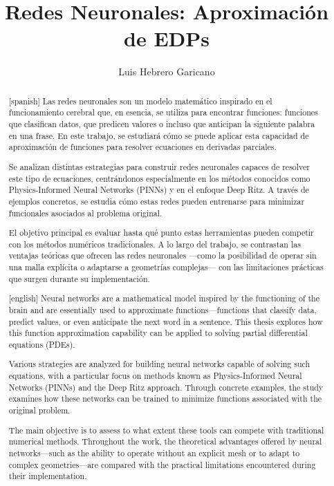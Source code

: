 \documentclass[a4paper,11pt,spanish, twoside, leqno]{tfg-uam}
\title{Redes Neuronales: Aproximación de EDPs}
\author{Luis Hebrero Garicano}
\theoremstyle{definition}
\begin{document}
\begin{abstract}[spanish]
Las redes neuronales son un modelo matemático inspirado en el funcionamiento cerebral que, en esencia, se utiliza para encontrar funciones: funciones que clasifican datos, que predicen valores o incluso que anticipan la siguiente palabra en una frase. En este trabajo, se estudiará cómo se puede aplicar esta capacidad de aproximación de funciones para resolver ecuaciones en derivadas parciales. 

Se analizan distintas estrategias para construir redes neuronales capaces de resolver este tipo de ecuaciones, centrándonos especialmente en los métodos conocidos como Physics-Informed Neural Networks (PINNs) y en el enfoque Deep Ritz. A través de ejemplos concretos, se estudia cómo estas redes pueden entrenarse para minimizar funcionales asociados al problema original.

El objetivo principal es evaluar hasta qué punto estas herramientas pueden competir con los métodos numéricos tradicionales. A lo largo del trabajo, se contrastan las ventajas teóricas que ofrecen las redes neuronales —como la posibilidad de operar sin una malla explícita o adaptarse a geometrías complejas— con las limitaciones prácticas que surgen durante su implementación. 
\end{abstract}
\begin{abstract}[english]
Neural networks are a mathematical model inspired by the functioning of the brain and are essentially used to approximate functions—functions that classify data, predict values, or even anticipate the next word in a sentence. This thesis explores how this function approximation capability can be applied to solving partial differential equations (PDEs).

Various strategies are analyzed for building neural networks capable of solving such equations, with a particular focus on methods known as Physics-Informed Neural Networks (PINNs) and the Deep Ritz approach. Through concrete examples, the study examines how these networks can be trained to minimize functions associated with the original problem.

The main objective is to assess to what extent these tools can compete with traditional numerical methods. Throughout the work, the theoretical advantages offered by neural networks—such as the ability to operate without an explicit mesh or to adapt to complex geometries—are compared with the practical limitations encountered during their implementation.
\end{abstract}
\mainmatter
\end{document}
